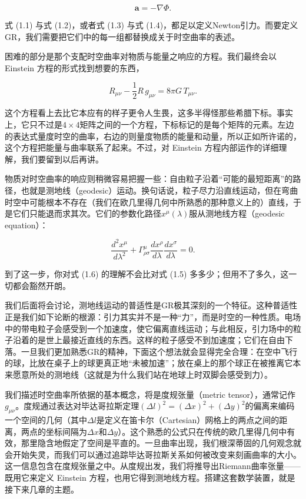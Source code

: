 \begin{equation*}
\mathbf{a} = -\nabla\Phi.
\tag{1.4}
\end{equation*}

式 (1.1) 与式 (1.2)，或者式 (1.3) 与式 (1.4)，都足以定义Newton引力。而要定义GR，我们需要把它们中的每一组都替换成关于时空曲率的表述。

困难的部分是那个支配时空曲率对物质与能量之响应的方程。我们最终会以 Einstein 方程的形式找到想要的东西，

\begin{equation*}
R_{\mu\nu} - \frac{1}{2}R\,g_{\mu\nu} = 8\pi G\,T_{\mu\nu}.
\tag{1.5}
\end{equation*}

这个方程看上去比它本应有的样子更令人生畏，这多半得怪那些希腊下标。事实上，它只不过是$4\times4$矩阵之间的一个方程，下标标记的是每个矩阵的元素。左边的表达式量度时空的曲率，右边的则量度物质的能量和动量，所以正如所许诺的，这个方程把能量与曲率联系了起来。不过，对 Einstein 方程内部运作的详细理解，我们要留到以后再讲。

物质对时空曲率的响应则稍微容易把握一些：自由粒子沿着“可能的最短距离”的路径，也就是测地线（geodesic）运动。换句话说，粒子尽力沿直线运动，但在弯曲时空中可能根本不存在（我们在欧几里得几何中所熟悉的那种意义上的）直线，于是它们只能退而求其次。它们的参数化路径$x^\mu(\lambda)$服从测地线方程（geodesic equation）：

\begin{equation*}
\frac{d^2x^\mu}{d\lambda^2} + \Gamma^\mu_{\rho\sigma}\frac{dx^\rho}{d\lambda}\frac{dx^\sigma}{d\lambda} = 0.
\tag{1.6}
\end{equation*}

到了这一步，你对式 (1.6) 的理解不会比对式 (1.5) 多多少；但用不了多久，这一切都会豁然开朗。

我们后面将会讨论，测地线运动的普适性是GR极其深刻的一个特征。这种普适性正是我们如下论断的根源：引力其实并不是一种“力”，而是时空的一种性质。电场中的带电粒子会感受到一个加速度，使它偏离直线运动；与此相反，引力场中的粒子沿着的是世上最接近直线的东西。这样的粒子感受不到加速度；它们在自由下落。一旦我们更加熟悉GR的精神，下面这个想法就会显得完全合理：在空中飞行的球，比放在桌子上的球更真正地“未被加速”；放在桌上的那个球正在被推离它本来愿意所处的测地线（这就是为什么我们站在地球上时双脚会感受到力）。

我们描述时空曲率所依据的基本概念，将是度规张量（metric tensor），通常记作$g_{\mu\nu}$。度规通过表达对毕达哥拉斯定理$(\Delta l)^2=(\Delta x)^2+(\Delta y)^2$的偏离来编码一个空间的几何（其中$\Delta l$是定义在笛卡尔（Cartesian）网格上的两点之间的距离，两点的坐标间隔为$\Delta x$和$\Delta y$）。这个熟悉的公式只在传统的欧几里得几何中有效，那里隐含地假定了空间是平直的。一旦曲率出现，我们根深蒂固的几何观念就会开始失灵，而我们可以通过追踪毕达哥拉斯关系如何被改变来刻画曲率的大小。这一信息包含在度规张量之中。从度规出发，我们将推导出Riemann曲率张量——既用它来定义 Einstein 方程，也用它得到测地线方程。搭建这套数学装置，就是接下来几章的主题。

